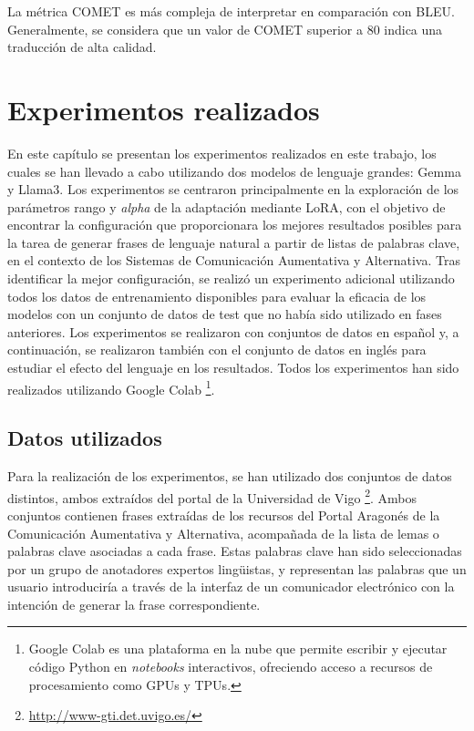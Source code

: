 \documentclass[11pt,spanish,listoffigures,listoftables]{tfgetsinf}
\begin{document}
La métrica COMET es más compleja de interpretar en comparación con BLEU. Generalmente, se considera que un valor de COMET superior a 80 indica una traducción de alta calidad.

\chapter{Experimentos realizados} \label{cap4}

En este capítulo se presentan los experimentos realizados en este trabajo, los cuales se han llevado a cabo utilizando dos modelos de lenguaje grandes: Gemma y Llama3. Los experimentos se centraron principalmente en la exploración de los parámetros rango y \textit{alpha} de la adaptación mediante LoRA, con el objetivo de encontrar la configuración que proporcionara los mejores resultados posibles para la tarea de generar frases de lenguaje natural a partir de listas de palabras clave, en el contexto de los Sistemas de Comunicación Aumentativa y Alternativa. Tras identificar la mejor configuración, se realizó un experimento adicional utilizando todos los datos de entrenamiento disponibles para evaluar la eficacia de los modelos con un conjunto de datos de test que no había sido utilizado en fases anteriores. Los experimentos se realizaron con conjuntos de datos en español y, a continuación, se realizaron también con el conjunto de datos en inglés para estudiar el efecto del lenguaje en los resultados. Todos los experimentos han sido realizados utilizando Google Colab \footnote{Google Colab es una plataforma  en la nube que permite escribir y ejecutar código Python en \textit{notebooks} interactivos, ofreciendo acceso a recursos de procesamiento como GPUs y TPUs.}.

\section{Datos utilizados}

Para la realización de los experimentos, se han utilizado dos conjuntos de datos distintos, ambos extraídos del portal de la Universidad de Vigo \footnote{\url{http://www-gti.det.uvigo.es/}}. Ambos conjuntos contienen frases extraídas de los recursos del Portal Aragonés de la Comunicación Aumentativa y Alternativa, acompañada de la lista de lemas o palabras clave asociadas a cada frase. Estas palabras clave han sido seleccionadas por un grupo de anotadores expertos lingüistas, y representan las palabras que un usuario introduciría a través de la interfaz de un comunicador electrónico con la intención de generar la frase correspondiente.
\end{document}
